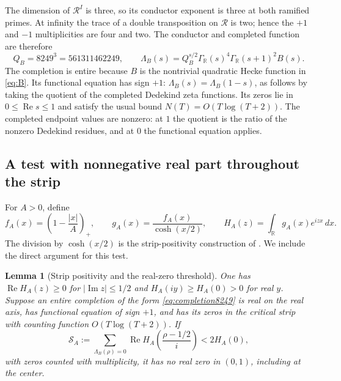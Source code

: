 \documentclass[11pt]{article}
\newtheorem{lemma}[theorem]{Lemma}
\theoremstyle{definition}
\theoremstyle{remark}
\newcommand{\R}{\mathbb R}
\newcommand{\Gr}{\Gamma_{\R}}
\newcommand{\dd}{\,d}
\newcommand{\Rea}{\operatorname{Re}}
\newcommand{\Ima}{\operatorname{Im}}
\numberwithin{equation}{section}
\begin{document}
The dimension of $\mathcal R^I$ is three, so its conductor exponent is three at both ramified primes. At infinity the trace of a double transposition on $\mathcal R$ is two; hence the $+1$ and $-1$ multiplicities are four and two. The conductor and completed function are therefore
\begin{equation}\label{eq:completion8249}
 Q_B=8249^3=561311462249,\qquad
 \Lambda_B(s)=Q_B^{s/2}\Gr(s)^4\Gr(s+1)^2B(s).
\end{equation}
The completion is entire because $B$ is the nontrivial quadratic Hecke function in \eqref{eq:B}. Its functional equation has sign $+1$:
$\Lambda_B(s)=\Lambda_B(1-s)$, as follows by taking the quotient of the completed Dedekind zeta functions. Its zeros lie in $0\le\Rea s\le1$ and satisfy the usual bound $N(T)=O(T\log(T+2))$. The completed endpoint values are nonzero: at $1$ the quotient is the ratio of the nonzero Dedekind residues, and at $0$ the functional equation applies.

\subsection{A test with nonnegative real part throughout the strip}

For $A>0$, define
\begin{equation}\label{eq:test8249}
 f_A(x)=\left(1-\frac{|x|}{A}\right)_+,\qquad
 g_A(x)=\frac{f_A(x)}{\cosh(x/2)},\qquad
 H_A(z)=\int_{\R}g_A(x)e^{izx}\dd x.
\end{equation}
The division by $\cosh(x/2)$ is the strip-positivity construction of \citet[Lemma 3.1]{miller}. We include the direct argument for this test.

\begin{lemma}[Strip positivity and the real-zero threshold]\label{lem:stripcertificate}
One has $\Rea H_A(z)\ge0$ for $|\Ima z|\le1/2$ and
$H_A(iy)\ge H_A(0)>0$ for real $y$. Suppose an entire completion of the form \eqref{eq:completion8249} is real on the real axis, has functional equation of sign $+1$, and has its zeros in the critical strip with counting function $O(T\log(T+2))$. If
\begin{equation}\label{eq:threshold}
\mathcal S_A:=\sum_{\Lambda_B(\rho)=0}
\Rea H_A\left(\frac{\rho-1/2}{i}\right)<2H_A(0),
\end{equation}
with zeros counted with multiplicity, it has no real zero in $(0,1)$, including at the center.
\end{lemma}
\end{document}
